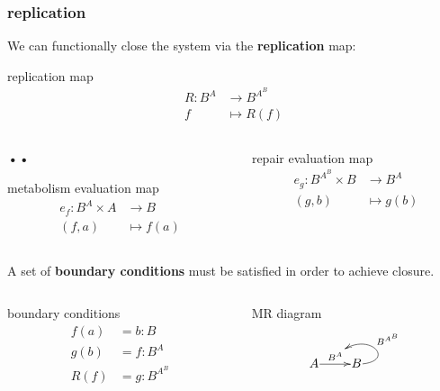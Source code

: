 \begin{frame}
\frametitle{replication}
We can functionally close the system via the \textbf{replication} map:
\begin{block}{replication map}
\abovedisplayskip=0pt
\begin{align*}
R: B^A & \longrightarrow B^{A^B}\\
f & \longmapsto R(f)
\end{align*}
\end{block}
 \begin{columns}
    \begin{column}{0.5\textwidth}
\textbf{\textbf{•\textbf{•}}}      \begin{block}{metabolism evaluation map}
		\abovedisplayskip=0pt
		\begin{align*}
		e_f : B^A \times A &\longrightarrow B\\
		(f,a) & \longmapsto f(a)
		\end{align*}
		\end{block}
    \end{column}
    \begin{column}{0.5\textwidth}
		\begin{block}{repair evaluation map}
			\abovedisplayskip=0pt
			\begin{align*}
			e_g: B^{A^B} \times B &\longrightarrow B^A\\
	    			            (g,b) & \longmapsto    g(b)
			\end{align*}
		\end{block}
    \end{column}
\end{columns}
\end{frame}

\begin{frame}
A set of \textbf{boundary conditions} must be satisfied in order to achieve closure.

\begin{columns}[t]
   \begin{column}{0.5\textwidth}
		\begin{block}{boundary conditions}
		\abovedisplayskip=0pt
			\begin{align*}
			f(a) &= b : B\\
			g(b) &= f : B^A\\
			R(f) &= g : B^{A^B}
			\end{align*}
		\end{block}
	\end{column}
	\begin{column}{0.5\textwidth}
		\begin{block}{MR diagram}
		\abovedisplayskip=0pt
		$$	\xymatrix@1{
			A \ar[r]^{B^A}="ba" & B \ar@(r,ur)_(.5) {B^{A^B}} [];"ba"}$$
		\end{block}
	\end{column}
\end{columns}
\end{frame}